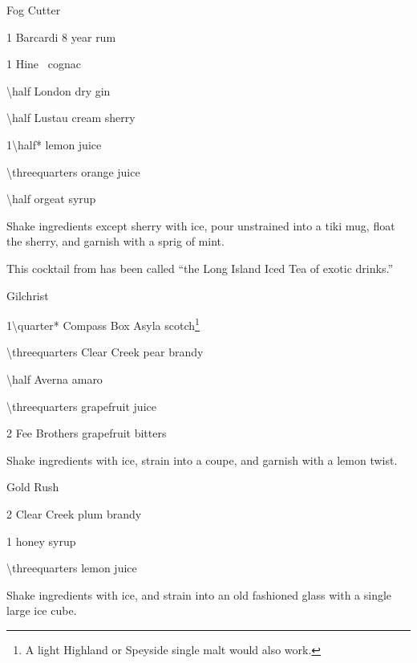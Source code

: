 \begin{Cocktail}[\PDT]{Fog Cutter}
  \begin{Ingredients}\normalsize
  \item \SI{1}{\oz} Barcardi 8 year rum
  \item \SI{1}{\oz} Hine \vsop\ cognac
  \item \SI{\half}{\oz} London dry gin
  \item \SI{\half}{\oz} Lustau cream sherry
  \item \SI{1\half*}{\oz} lemon juice
  \item \SI{\threequarters}{\oz} orange juice
  \item \SI{\half}{\oz} orgeat syrup
  \end{Ingredients}
  
  \begin{Instructions}\small
	Shake ingredients except sherry with ice, pour unstrained into a tiki mug, float the sherry, and garnish with a sprig of mint.
	
	This cocktail from  has been called ``the Long Island Iced Tea of exotic drinks.''
  \end{Instructions}
\end{Cocktail}

\begin{Cocktail}[\PDT]{Gilchrist}
  \begin{Ingredients}
  \item \SI{1\quarter*}{\oz} Compass Box Asyla scotch\footnote{A light Highland or Speyside single malt would also work.}
  \item \SI{\threequarters}{\oz} Clear Creek pear brandy
  \item \SI{\half}{\oz} Averna amaro
  \item \SI{\threequarters}{\oz} grapefruit juice
  \item 2 \si{\dashes} Fee Brothers grapefruit bitters
  \end{Ingredients}
  
  \begin{Instructions}
	Shake ingredients with ice, strain into a coupe, and garnish with a lemon twist.
  \end{Instructions}
\end{Cocktail}

\begin{Cocktail}[\MH]{Gold Rush}
  \begin{Ingredients}
  \item \SI{2}{\oz} Clear Creek plum brandy
  \item \SI{1}{\oz} honey syrup
  \item \SI{\threequarters}{\oz} lemon juice
  \end{Ingredients}
  
  \begin{Instructions}
	Shake ingredients with ice, and strain into an old fashioned glass with a single large ice cube.
  \end{Instructions}
\end{Cocktail}

